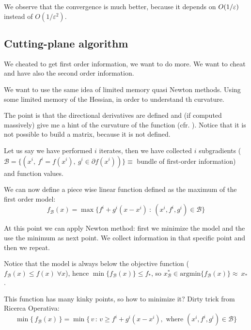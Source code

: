 \documentclass[ComputationalMathematics.tex]{subfiles}
\begin{document}
We observe that the convergence is much better, because it depends on $O(1 / \varepsilon)$ instead of $O(1/\varepsilon^2)$.


\subsection{Cutting-plane algorithm}
We cheated to get first order information, we want to do more. We want to cheat and have also the second order information.

We want to use the same idea of limited memory quasi Newton methods. Using some limited memory of the Hessian, in order to understand th curvature.

The point is that the directional derivatives are defined and (if computed massively) give me a hint of the curvature of the function (cfr. ).
Notice that it is not possible to build a matrix, because it is not defined.


Let us say we have performed $i$ iterates, then we have collected $i$ subgradients ($\mathscr{B} = \{(x^i,~f^i = f(x^i),~g^i \in \partial f(x^i))\} \equiv$ bundle of first-order information) and function values.

We can now define a piece wise linear function defined as the maximum of the first order model:
\[
  f_{\mathscr{B}}(x) = \max \{f^i + g^i (x - x^i)~:~(x^i, f^i, g^i) \in \mathscr{B}\}
\]

At this point we can apply Newton method: first we minimize the model and the use the minimum as next point. We collect information in that specific point and then we repeat.

 Notice that the model is always below the objective function ($f_{\mathscr{B}}(x) \leq f(x) \; \forall x$), hence $\min \{f_{\mathscr{B}}(x)\} \leq f_*$, so $x^*_{\mathscr{B}} \in \mbox{argmin} \{f_{\mathscr{B}}(x) \} \approx~x_*$.

 This function has many kinky points, so how to minimize it?
Dirty trick from Ricerca Operativa: 
\[
  \min \{ \, f_{\mathscr{B}}(x) \, \} = \min \{ \, v \,:\, v \geq f^i + g^i (x - x^i),\text{ where } (x^i,f^i,g^i) \in \mathscr{B}\}
\]
\end{document}

